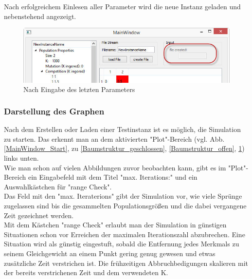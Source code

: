 \documentclass[11pt, a4paper, german]{article}
\theoremstyle{plain}
\begin{document}
	Nach erfolgreichem Einlesen aller Parameter wird die neue Instanz geladen und nebenstehend angezeigt.
	
	\begin{figure}[H]
		\centering
		\includegraphics[width=1\linewidth]{./Pictures/MainWindow_FileCreated}
		\caption[Datei erstellt]{Nach Eingabe des letzten Parameters}
		\label{fig:MainWindow_FileCreated}
	\end{figure}
	
	\subsubsection{Darstellung des Graphen}
	Nach dem Erstellen oder Laden einer Testinstanz ist es möglich, die Simulation zu starten. Das erkennt man an dem aktivierten "{}Plot"{}-Bereich (vgl. Abb. \ref{MainWindow_Start}, zu \ref{Baumstruktur_geschlossen}, \ref{Baumstruktur_offen}, \ref{fig:MainWindow_FileCreated}) links unten.\\
	Wie man schon auf vielen Abbildungen zuvor beobachten kann, gibt es im "{}Plot"{}-Bereich ein Eingabefeld mit dem Titel "{}max. Iterations:"{} und ein Auswahlkästchen für "{}range Check"{}.\\
	Das Feld mit den "{}max. Iteraterions"{} gibt der Simulation vor, wie viele Sprünge zugelassen sind bis die gesammelten Populationsgrößen und die dabei vergangene Zeit gezeichnet werden. \\
	Mit dem Kästchen "{}range Check"{} erlaubt man der Simulation in günstigen Situationen schon vor Erreichen der maximalen Iterationszahl abzubrechen. Eine Situation wird als günstig eingestuft, sobald die Entfernung jedes Merkmals zu seinem Gleichgewicht an einem Punkt gering genug gewesen und etwas zusätzliche Zeit verstrichen ist. Die frühzeitigen Abbruchbedigungen skalieren mit der bereits verstrichenen Zeit und dem verwendeten K.\\
\end{document}
